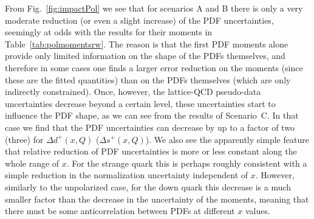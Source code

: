 From Fig.~\ref{fig:impactPol} we see that for scenarios
A and B there is only a very moderate reduction (or even a slight increase)
of the PDF uncertainties, seemingly at odds with the results
for their moments in Table~\ref{tab:polmomentsrw}.
%
The reason is that the first PDF moments alone provide only limited
information on the shape of the PDFs themselves, and therefore in some
cases one finds a larger error reduction on the moments (since these
are the fitted quantities) than on the PDFs themselves (which are
only indirectly constrained).
%
Once, however, the lattice-QCD pseudo-data uncertainties
decrease beyond a certain level, these uncertainties start to influence the 
PDF shape, as we can see from the results of Scenario~C.
%
In that case we find that the PDF uncertainties can decrease by up to a factor
of two (three) for $\Delta d^+(x,Q)$ ($\Delta s^+(x,Q)$).
%
We also see the apparently simple feature that relative reduction of PDF 
uncertainties is more or less constant along the whole range of $x$. 
%
For the strange quark this is perhaps roughly consistent with a simple 
reduction in the normalization uncertainty independent of $x$.
%
However, similarly to the unpolarized case, for the down quark this 
decrease is a much smaller factor than the decrease in the uncertainty 
of the moments, meaning that there must be some anticorrelation between 
PDFs at different $x$ values.  


